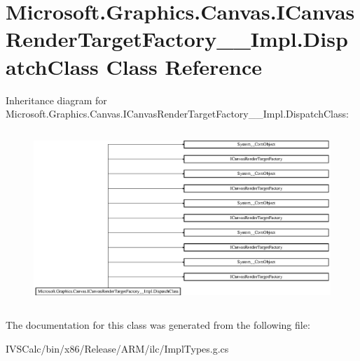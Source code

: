 \hypertarget{class_microsoft_1_1_graphics_1_1_canvas_1_1_i_canvas_render_target_factory_____impl_1_1_dispatch_class}{}\section{Microsoft.\+Graphics.\+Canvas.\+I\+Canvas\+Render\+Target\+Factory\+\_\+\+\_\+\+Impl.\+Dispatch\+Class Class Reference}
\label{class_microsoft_1_1_graphics_1_1_canvas_1_1_i_canvas_render_target_factory_____impl_1_1_dispatch_class}
Inheritance diagram for Microsoft.\+Graphics.\+Canvas.\+I\+Canvas\+Render\+Target\+Factory\+\_\+\+\_\+\+Impl.\+Dispatch\+Class\+:\begin{figure}[H]
\begin{center}
\leavevmode
\includegraphics[height=6.609442cm]{class_microsoft_1_1_graphics_1_1_canvas_1_1_i_canvas_render_target_factory_____impl_1_1_dispatch_class}
\end{center}
\end{figure}


The documentation for this class was generated from the following file\+:\begin{DoxyCompactItemize}
\item 
I\+V\+S\+Calc/bin/x86/\+Release/\+A\+R\+M/ilc/Impl\+Types.\+g.\+cs\end{DoxyCompactItemize}
